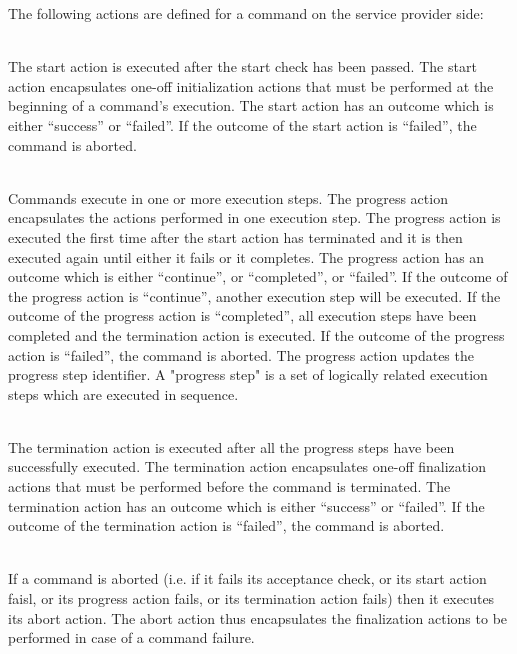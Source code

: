 The following actions are defined for a command on the service provider side:

\begin{fw_description}
\item[Start Action]\hfill\\
The start action is executed after the start check has been passed. The start action encapsulates one-off initialization actions that must be performed at the beginning of a command's execution. 
The start action has an outcome which is either “success” or “failed”. If the outcome of the start action is “failed”, the command is aborted. 
\item[Progress Action]\hfill\\
Commands execute in one or more execution steps. The progress action encapsulates the actions performed in one execution step. The progress action is executed the first time after the start action has terminated and it is then executed again until either it fails or it completes. 
The progress action has an outcome which is either “continue”, or “completed”, or “failed”. If the outcome of the progress action is “continue”, another execution step will be executed. If the outcome of the progress action is “completed”, all execution steps have been completed and the termination action is executed. If the outcome of the progress action is “failed”, the command is aborted. 
The progress action updates the progress step identifier. A "progress step" is a set of logically related execution steps which are executed in sequence.
\item[Termination Action]\hfill\\
The termination action is executed after all the progress steps have been successfully executed. The termination action encapsulates one-off finalization actions that must be performed before the command is terminated.
The termination action has an outcome which is either “success” or “failed”. If the outcome of the termination action is “failed”, the command is aborted. 
\item[Abort Action]\hfill\\
If a command is aborted (i.e. if it fails its acceptance check, or its start action faisl, or its progress action fails, or its termination action fails) then it executes its abort action. The abort action thus encapsulates the finalization actions to be performed in case of a command failure. 
\end{fw_description}

